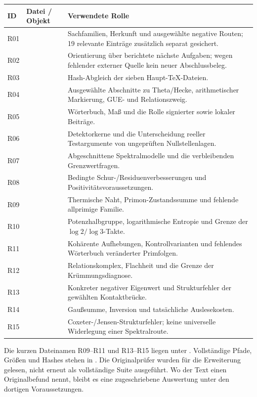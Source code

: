 \begin{longtable}{L{13mm}L{63mm}L{72mm}}
\toprule\textbf{ID}&\textbf{Datei / Objekt}&\textbf{Verwendete Rolle}\\\midrule\endhead
R01&&Sachfamilien, Herkunft und ausgewählte negative Routen; 19 relevante Einträge zusätzlich separat gesichert.\\
R02&&Orientierung über berichtete nächste Aufgaben; wegen fehlender externer Quelle kein neuer Abschlussbeleg.\\
R03&&Hash-Abgleich der sieben Haupt-TeX-Dateien.\\
R04&&Ausgewählte Abschnitte zu Theta/Hecke, arithmetischer Markierung, GUE- und Relationszweig.\\
R05&&Wörterbuch, Maß und die Rolle signierter sowie lokaler Beiträge.\\
R06&&Detektorkerne und die Unterscheidung reeller Testargumente von ungeprüften Nullstellenlagen.\\
R07&&Abgeschnittene Spektralmodelle und die verbleibenden Grenzwertfragen.\\
R08&&Bedingte Schur-/Residuenverbesserungen und Positivitätsvoraussetzungen.\\
R09&&Thermische Naht, Primon-Zustandssumme und fehlende allprimige Familie.\\
R10&&Potenzhalbgruppe, logarithmische Entropie und Grenze der $\log2/\log3$-Takte.\\
R11&&Kohärente Aufhebungen, Kontrollvarianten und fehlendes Wörterbuch veränderter Primfolgen.\\
R12&&Relationskomplex, Flachheit und die Grenze der Krümmungsdiagnose.\\
R13&&Konkreter negativer Eigenwert und Strukturfehler der gewählten Kontaktbrücke.\\
R14&&Gaußsumme, Inversion und tatsächliche Auslesekosten.\\
R15&&Coxeter-/Jensen-Strukturfehler; keine universelle Widerlegung einer Spektralroute.\\\bottomrule
\end{longtable}
Die kurzen Dateinamen R09--R11 und R13--R15 liegen unter . Vollständige Pfade, Größen und Hashes stehen in . Die Originalprüfer wurden für die Erweiterung gelesen, nicht erneut als vollständige Suite ausgeführt. Wo der Text einen Originalbefund nennt, bleibt es eine zugeschriebene Auswertung unter den dortigen Voraussetzungen.

